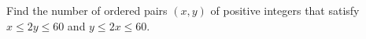 Find the number of ordered pairs $(x,y)$ of positive integers that satisfy $x\le 2y\le 60$ and $y\le 2x\le 60.$
